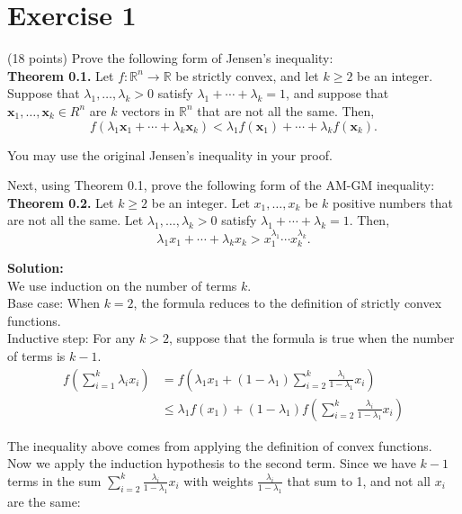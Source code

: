 \documentclass{article}
\begin{document}
\section*{Exercise 1}
(18 points) Prove the following form of Jensen's inequality: \\

\textbf{Theorem 0.1.} Let $f : \mathbb{R}^n \to \mathbb{R}$ be strictly convex, and let $k \geq 2$ be an integer. Suppose that $\lambda_1, \ldots, \lambda_k > 0$ satisfy $\lambda_1 + \cdots + \lambda_k = 1$, and suppose that $\mathbf{x}_1, \ldots, \mathbf{x}_k \in R^n$ are $k$ vectors in $\mathbb{R}^n$ that are not all the same. Then,
\[
f(\lambda_1 \mathbf{x}_1 + \cdots + \lambda_k \mathbf{x}_k) < \lambda_1 f(\mathbf{x}_1) + \cdots + \lambda_k f(\mathbf{x}_k).
\]

You may use the original Jensen's inequality in your proof.

Next, using Theorem 0.1, prove the following form of the AM-GM inequality: \\

\textbf{Theorem 0.2.} Let $k \geq 2$ be an integer. Let $x_1, \ldots, x_k$ be $k$ positive numbers that are not all the same. Let $\lambda_1, \ldots, \lambda_k > 0$ satisfy $\lambda_1 + \cdots + \lambda_k = 1$. Then,
\[
\lambda_1 x_1 + \cdots + \lambda_k x_k > x_1^{\lambda_1} \cdots x_k^{\lambda_k}.
\]

\textbf{Solution:} \\

We use induction on the number of terms $k$. \\

Base case: When $k = 2$, the formula reduces to the definition of strictly convex functions. \\

Inductive step: For any $k > 2$, suppose that the formula is true when the number of terms is $k - 1$.
\begin{align*}
f\left(\sum_{i=1}^{k} \lambda_i x_i\right) &= f\left(\lambda_1 x_1 + (1 - \lambda_1) \sum_{i=2}^{k} \frac{\lambda_i}{1 - \lambda_1}x_i\right)\\
&\leq \lambda_1 f(x_1) + (1 - \lambda_1)f\left(\sum_{i=2}^{k} \frac{\lambda_i}{1 - \lambda_1} x_i\right)
\end{align*}

The inequality above comes from applying the definition of convex functions. \\

Now we apply the induction hypothesis to the second term. Since we have $k-1$ terms in the sum $\sum_{i=2}^{k} \frac{\lambda_i}{1 - \lambda_1} x_i$ with weights $\frac{\lambda_i}{1 - \lambda_1}$ that sum to 1, and not all $x_i$ are the same:
\end{document}
